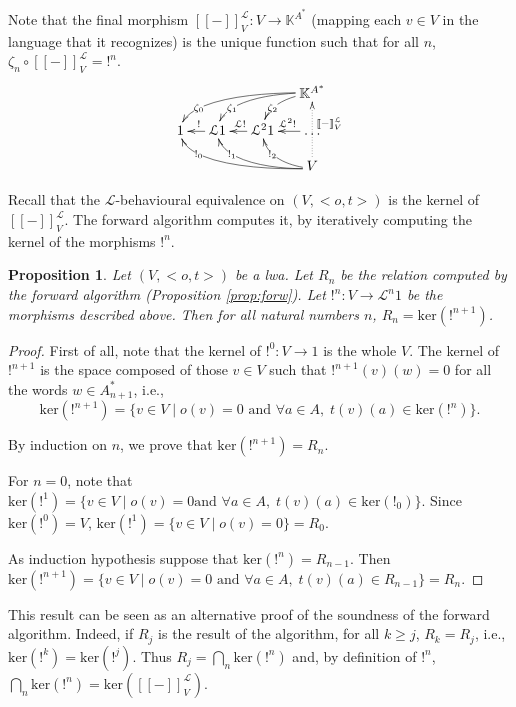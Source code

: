 \documentclass[3p]{elsarticle}
\newcommand{\fL}{\mathcal{L}}    %
\newcommand{\beh}[3]{\left[\!\left[ #1 \right]\!\right]^{#2}_{#3}} %
\newcommand{\comp}{\circ}               %
\newcommand{\K}{\mathbb{K}}            %
\newcommand{\kernel}{\mathrm{ker}} %
\newcommand{\lwa}{{\sc lwa}}           %
\newtheorem{proposition}{Proposition}
\begin{document}
Note that the final morphism $\beh{-}{\fL}{V} \colon V \to \K^{A^*}$
(mapping each $v\in V$ in the language that it recognizes) is the
unique function such that for all $n$, $\zeta_n \comp
\beh{-}{\fL}{V} = !^n$.
$$\xymatrix@C=12pt@R=12pt{&&& \K^{A^*}\ar@(r,u)[dl]|(0.8){\zeta_2} \ar@(r,u)[dll]|(0.8){\zeta_1} \ar@(r,u)[dlll]|(0.8){\zeta_0}\\
1  & \fL1 \ar[l]_{!}  & \fL^21\ar[l]_{\fL!} & \dots\ar[l]_{\fL^2!} \\
&&& V \ar@{.>}[uu]_(0.6){\beh{-}{\fL}{V}} \ar@(r,d)[ul]|(0.8){!_2}
\ar@(r,d)[ull]|(0.8){!_1} \ar@(r,d)[ulll]|(0.8){!_0}}$$


Recall that the $\fL$-behavioural equivalence on $(V,<o,t>)$ is the
kernel of $\beh{-}{\fL}{V}$. The forward algorithm computes it, by
iteratively computing the kernel of the morphisms $!^n$.
%
\begin{proposition}
Let $(V,<o,t>)$ be a \lwa. Let $R_n$ be the relation computed by the
forward algorithm (Proposition \ref{prop:forw}). Let $!^n \colon
V\to \fL^n1$ be the morphisms described above. Then for all natural
numbers $n$, $R_n=\kernel(!^{n+1})$.
\end{proposition}

\begin{proof}
First of all, note that the kernel of $!^0 \colon V \to 1$ is the
whole $V$. The kernel of $!^{n+1}$ is the space composed of those $v\in V$ such
that $!^{n+1}(v)(w)=0$ for all the words $w\in A^*_{n+1}$, i.e.,
$$\kernel(!^{n+1})=\{v\in V \;|\; o(v)=0 \text{ and }\forall
a\in A, \; t(v)(a) \in \kernel(!^n) \}\text{.}$$

By induction on $n$, we prove that $\kernel(!^{n+1})=R_n$.

For $n=0$, note that $\kernel(!^{1})= \{v\in V \;|\; o(v)=0 \text{
and }\forall a\in A, \; t(v)(a) \in \kernel(!_0) \}$. Since
$\kernel(!^0)=V$, $\kernel(!^{1})= \{v\in V \;|\; o(v)=0 \}=R_0$.

As induction hypothesis suppose that $\kernel(!^{n})=R_{n-1}$. Then
$\kernel(!^{n+1})=\{v\in V \;|\; o(v)=0 \text{ and }\forall a\in A,
\; t(v)(a) \in R_{n-1} \}=R_n$.
\end{proof}

This result can be seen as an alternative proof of the soundness of
the forward algorithm. Indeed, if $R_j$ is the result of the
algorithm, for all $k\geq j$, $R_k=R_j$, i.e.,
$\kernel(!^k)=\kernel(!^j)$. Thus $R_j=\bigcap_n \kernel(!^n)$ and,
by definition of $!^n$, $\bigcap_n
\kernel(!^n)=\kernel(\beh{-}{\fL}{V})$.
\end{document}
